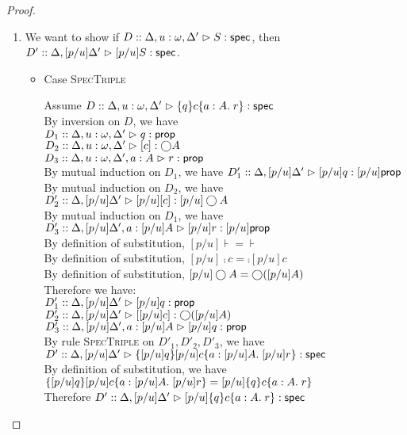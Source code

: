 \begin{proof}
\begin{enumerate}
  \item We want to show if $D :: \judgeS[{\Delta, u:\omega, \Delta'}]{S}$, then 
         $D' :: \judgeS[{\Delta, [p/u]\Delta'}]{[p/u]S}$. 
    \begin{itemize}
    \item Case \textsc{SpecTriple}
      \begin{tabbedproof}
        \oo Assume $D :: \judgeS[{\Delta, u:\omega, \Delta'}]{\spec{q}{c}{a:A}{r}}$ \\
        \ooo By inversion on $D$, we have \\
        \oooo $D_1 :: \judgeA[{\Delta, u:\omega, \Delta'}]{q}{\assert}$ \\
        \oooo $D_2 :: \judgeA[{\Delta, u:\omega, \Delta'}]{\comp{c}}{\monad{A}}$ \\
        \oooo $D_3 :: \judgeA[{\Delta, u:\omega, \Delta', a:A}]{r}{\assert}$ \\
        \ooo By mutual induction on $D_1$, we have 
             $D'_1 :: \judgeA[{\Delta, [p/u]\Delta'}]{[p/u]q}{[p/u]\assert}$ \\
        \ooo By mutual induction on $D_2$, we have 
             $D'_2 :: \judgeA[{\Delta, [p/u]\Delta'}]{[p/u]\comp{c}}{[p/u]\monad{A}}$ \\
        \ooo By mutual induction on $D_1$, we have 
             $D'_3 :: \judgeA[{\Delta, [p/u]\Delta', a:[p/u]A}]{[p/u]r}{[p/u]\assert}$ \\
        \ooo By definition of substitution, $[p/u]\assert = \assert$ \\
        \ooo By definition of substitution, $[p/u]\comp{c} = \comp{[p/u]c}$ \\
        \ooo By definition of substitution, $[p/u]\monad{A} = \monad{([p/u]A)}$ \\
        \ooo Therefore we have:\\
        \oooo $D'_1 :: \judgeA[{\Delta, [p/u]\Delta'}]{[p/u]q}{\assert}$ \\
        \oooo $D'_2 :: \judgeA[{\Delta, [p/u]\Delta'}]{\comp{[p/u]c}}{\monad{([p/u]A)}}$ \\
        \oooo $D'_3 :: \judgeA[{\Delta, [p/u]\Delta', a:[p/u]A}]{[p/u]q}{\assert}$ \\
        \ooo By rule \textsc{SpecTriple} on $D'_1, D'_2, D'_3$, we have \\
        \oox $D' :: \judgeS[{\Delta, [p/u]\Delta'}]
                            {\spec{[p/u]q}{[p/u]c}{a:[p/u]A}{[p/u]r}}$ \\
        \ooo By definition of substitution, we have \\
        \oox $\spec{[p/u]q}{[p/u]c}{a:[p/u]A}{[p/u]r} = [p/u]\spec{q}{c}{a:A}{r}$ \\
        \ooo Therefore $D' :: \judgeS[{\Delta, [p/u]\Delta'}]{[p/u]\spec{q}{c}{a:A}{r}}$ \\
      \end{tabbedproof}


\end{itemize}
\end{enumerate}
\end{proof}
